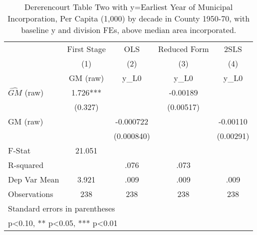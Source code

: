 \begin{table}[htbp]\centering
\def\sym#1{\ifmmode^{#1}\else\(^{#1}\)\fi}
\caption{Dererencourt Table Two with y=Earliest Year of Municipal Incorporation, Per Capita (1,000) by decade in County 1950-70, with baseline y and division FEs, above median area incorporated.}
\begin{tabular}{l*{4}{c}}
\toprule
                    & First Stage   &         OLS   &Reduced Form   &        2SLS   \\
                    &\multicolumn{1}{c}{(1)}&\multicolumn{1}{c}{(2)}&\multicolumn{1}{c}{(3)}&\multicolumn{1}{c}{(4)}\\
                    &\multicolumn{1}{c}{GM  (raw)}&\multicolumn{1}{c}{y\_L0}&\multicolumn{1}{c}{y\_L0}&\multicolumn{1}{c}{y\_L0}\\
\midrule
$\hat{GM}$ (raw)    &       1.726***&               &    -0.00189   &               \\
                    &     (0.327)   &               &   (0.00517)   &               \\
\addlinespace
GM  (raw)           &               &   -0.000722   &               &    -0.00110   \\
                    &               &  (0.000840)   &               &   (0.00291)   \\
\midrule
F-Stat              &      21.051   &               &               &               \\
R-squared           &               &        .076   &        .073   &               \\
Dep Var Mean        &       3.921   &        .009   &        .009   &        .009   \\
Observations        &         238   &         238   &         238   &         238   \\
\bottomrule
\multicolumn{5}{l}{\footnotesize Standard errors in parentheses}\\
\multicolumn{5}{l}{\footnotesize * p<0.10, ** p<0.05, *** p<0.01}\\
\end{tabular}
\end{table}
